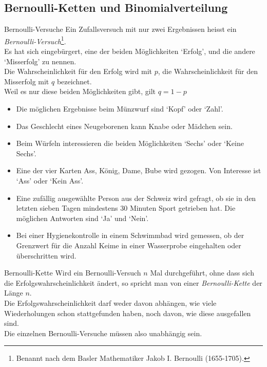 \subsection{Bernoulli-Ketten und Binomialverteilung}
\begin{definition}
    {Bernoulli-Versuche}{}
    Ein Zufallsversuch mit nur zwei Ergebnissen heisst ein \textit{Bernoulli-Versuch}\footnote{Benannt nach dem Basler Mathematiker Jakob I. Bernoulli (1655-1705).}. \\
    Es hat sich eingebürgert, eine der beiden Möglichkeiten `Erfolg', und die andere `Misserfolg' zu nennen. \\
    Die Wahrscheinlichkeit für den Erfolg wird mit \( p \), die Wahrscheinlichkeit für den Misserfolg mit \( q \) bezeichnet. \\
    Weil es nur diese beiden Möglichkeiten gibt, gilt \( q = 1 - p \)
\end{definition}
\begin{bsp}
    {}{}
    \begin{itemize}
        \item Die möglichen Ergebnisse beim Münzwurf sind `Kopf' oder `Zahl'.
        \item Das Geschlecht eines Neugeborenen kann Knabe oder Mädchen sein.
        \item Beim Würfeln interessieren die beiden Möglichkeiten `Sechs' oder `Keine Sechs'.
        \item Eine der vier Karten Ass, König, Dame, Bube wird gezogen. Von Interesse ist `Ass' oder `Kein Ass'.
        \item Eine zufällig ausgewählte Person aus der Schweiz wird gefragt, ob sie in den letzten sieben Tagen mindestens 30 Minuten Sport getrieben hat. Die möglichen Antworten sind `Ja' und `Nein'.
        \item Bei einer Hygienekontrolle in einem Schwimmbad wird gemessen, ob der Grenzwert für die Anzahl Keime in einer Wasserprobe eingehalten oder überschritten wird.
    \end{itemize}
\end{bsp}

\begin{definition}
    {Bernoulli-Kette}{}
    Wird ein Bernoulli-Versuch \( n \) Mal durchgeführt, ohne dass sich die Erfolgswahrscheinlichkeit ändert, so spricht man von einer \textit{Bernoulli-Kette} der Länge \( n \). \\
    Die Erfolgswahrscheinlichkeit darf weder davon abhängen, wie viele Wiederholungen schon stattgefunden haben, noch davon, wie diese ausgefallen sind. \\
    Die einzelnen Bernoulli-Versuche müssen also unabhängig sein.
\end{definition}

